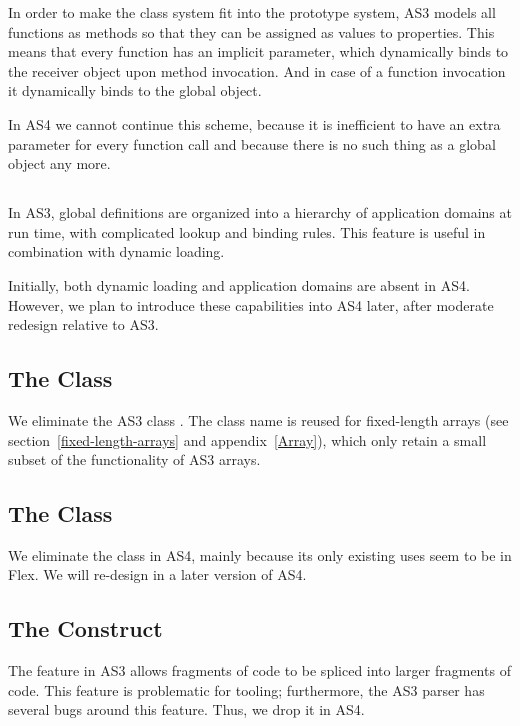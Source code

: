 In order to make the class system fit into the prototype system, AS3 models all
functions as methods so that they can be assigned as values to properties. This
means that every function has an implicit  parameter, which
dynamically binds to the receiver object upon method invocation. And in case of
a function invocation it dynamically binds to the global object.

In AS4 we cannot continue this scheme, because it is inefficient to have an
extra parameter for every function call and because there is no such thing as a
global object any more.

\subsection{}

In AS3, global definitions are organized into a hierarchy of application domains
at run time, with complicated lookup and binding rules. This feature is useful
in combination with dynamic loading.

Initially, both dynamic loading and application domains are absent in AS4.
However, we plan to introduce these capabilities into AS4 later,
after moderate redesign relative to AS3.

\subsection{The  Class}

We eliminate the AS3 class . The class name is reused for fixed-length arrays (see
section~\ref{fixed-length-arrays} and appendix~\ref{Array}), which only retain a small subset of the functionality of
AS3 arrays.

\subsection{The  Class}

We eliminate the  class in AS4, mainly because its only
existing uses seem to be in Flex. We will re-design  in
a later version of AS4.


\subsection{The  Construct}

The  feature in AS3 allows fragments of code to be
spliced into larger fragments of code. This feature is
problematic for tooling; furthermore, the AS3 parser has several bugs around
this feature. Thus, we drop it in AS4.

